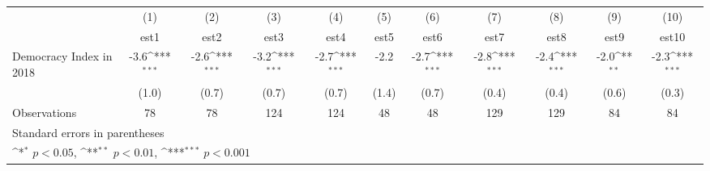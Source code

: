 {
\def\sym#1{\ifmmode^{#1}\else\(^{#1}\)\fi}
\begin{tabular}{l*{10}{c}}
\hline\hline
                    &\multicolumn{1}{c}{(1)}         &\multicolumn{1}{c}{(2)}         &\multicolumn{1}{c}{(3)}         &\multicolumn{1}{c}{(4)}         &\multicolumn{1}{c}{(5)}         &\multicolumn{1}{c}{(6)}         &\multicolumn{1}{c}{(7)}         &\multicolumn{1}{c}{(8)}         &\multicolumn{1}{c}{(9)}         &\multicolumn{1}{c}{(10)}         \\
                    &        est1         &        est2         &        est3         &        est4         &        est5         &        est6         &        est7         &        est8         &        est9         &       est10         \\
\hline
Democracy Index in 2018&        -3.6\sym{***}&        -2.6\sym{***}&        -3.2\sym{***}&        -2.7\sym{***}&        -2.2         &        -2.7\sym{***}&        -2.8\sym{***}&        -2.4\sym{***}&        -2.0\sym{**} &        -2.3\sym{***}\\
                    &       (1.0)         &       (0.7)         &       (0.7)         &       (0.7)         &       (1.4)         &       (0.7)         &       (0.4)         &       (0.4)         &       (0.6)         &       (0.3)         \\
\hline
Observations        &          78         &          78         &         124         &         124         &          48         &          48         &         129         &         129         &          84         &          84         \\
\hline\hline
\multicolumn{11}{l}{\footnotesize Standard errors in parentheses}\\
\multicolumn{11}{l}{\footnotesize \sym{*} \(p<0.05\), \sym{**} \(p<0.01\), \sym{***} \(p<0.001\)}\\
\end{tabular}
}
